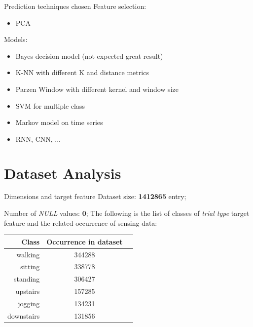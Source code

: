 \documentclass{beamer}
\begin{document}
\begin{frame}{Prediction techniques chosen}
Feature selection:
\begin{itemize}
	\item PCA
\end{itemize}
Models:
\begin{itemize}
	\item Bayes decision model (not expected great result)
	\item K-NN with different K and distance metrics
	\item Parzen Window with different kernel and window size
	\item SVM for multiple class 
	\item Markov model on time series 
	\item RNN, CNN, ...
\end{itemize}
\end{frame}

\section{Dataset Analysis}
\begin{frame}{Dimensions and target feature}
Dataset size: \textbf{1412865} entry;

Number of \textit{NULL} values: \textbf{0};
\vfill
The following is the list of classes of \textit{trial type} target feature and the related occurrence of sensing data:
\begin{table} 
	\centering
	\begin{tabular}{rcc}
		Class & Occurrence in dataset \\\hline
		walking & 344288 \\
		sitting & 338778 \\
		standing & 306427 \\
		upstairs & 157285 \\
		jogging & 134231 \\
		downstairs & 131856 \\
	\end{tabular}
\end{table}
\end{frame}
\end{document}
